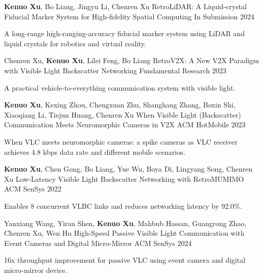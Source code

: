 \documentclass[11pt, a4paper]{awesome-cv}
\begin{document}
\begin{cventries}
	
	\cventry
	{\textbf{Kenuo Xu}, Bo Liang, Jingyu Li, Chenren Xu}
	{RetroLiDAR: A Liquid-crystal Fiducial Marker System for High-fidelity Spatial Computing}
	{In Submission}
	{2024}
	{
		\begin{cvitems} %
			\item {A long-range high-ranging-accuracy fiducial marker system using LiDAR and liquid crystals for robotics and virtual reality.}
		\end{cvitems}
	}
		
	\cventry
	{Chenren Xu, \textbf{Kenuo Xu}, Lilei Feng, Bo Liang}
	{RetroV2X: A New V2X Paradigm with Visible Light Backscatter Networking}
	{Fundamental Research}
	{2023}
	{
		\begin{cvitems} %
			\item {A practical vehicle-to-everything communication system with visible light.}
		\end{cvitems}
	}
	
	\cventry
	{\textbf{Kenuo Xu}, Kexing Zhou, Chengxuan Zhu, Shanghang Zhang, Boxin Shi, Xiaoqiang Li, Tiejun Huang, Chenren Xu}
	{When Visible Light (Backscatter) Communication Meets Neuromorphic Cameras in V2X}
	{ACM HotMobile}
	{2023}
	{
		\begin{cvitems} %
			\item {When VLC meets neuromorphic cameras: a spike cameras as VLC receiver achieves 4.8 kbps data rate and different mobile scenarios.}
		\end{cvitems}
	}

	\cventry
	{\textbf{Kenuo Xu}, Chen Gong, Bo Liang, Yue Wu, Boya Di, Lingyang Song, Chenren Xu}
	{Low-Latency Visible Light Backscatter Networking with RetroMUMIMO}
	{ACM SenSys}
	{2022}
	{
		\begin{cvitems} %
			\item {Enables 8 concurrent VLBC links and reduces networking latency by 92.0\%.}
		\end{cvitems}
	}
	
	\cventry
	{Yanxiang Wang, Yiran Shen, \textbf{Kenuo Xu}, Mahbub Hassan, Guangrong Zhao, Chenren Xu, Wen Hu}
	{High-Speed Passive Visible Light Communication with Event Cameras and Digital Micro-Mirror}
	{ACM SenSys}
	{2024}
	{
		\begin{cvitems} %
			\item {16x throughput improvement for passive VLC using event camera and digital micro-mirror device.}
		\end{cvitems}
	}
	

\end{cventries}
\end{document}
